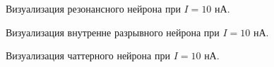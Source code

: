 \begin{figure}[h]
	\caption{Визуализация резонансного нейрона при $I=10$ нА.}
	\label{1_rz}
\end{figure}

\begin{figure}[h]
	\caption{Визуализация внутренне разрывного нейрона при $I=10$ нА.}
	\label{1_ib}
\end{figure}

\begin{figure}[h]
	\caption{Визуализация чаттерного нейрона при $I=10$ нА.}
	\label{1_ch}
\end{figure}

